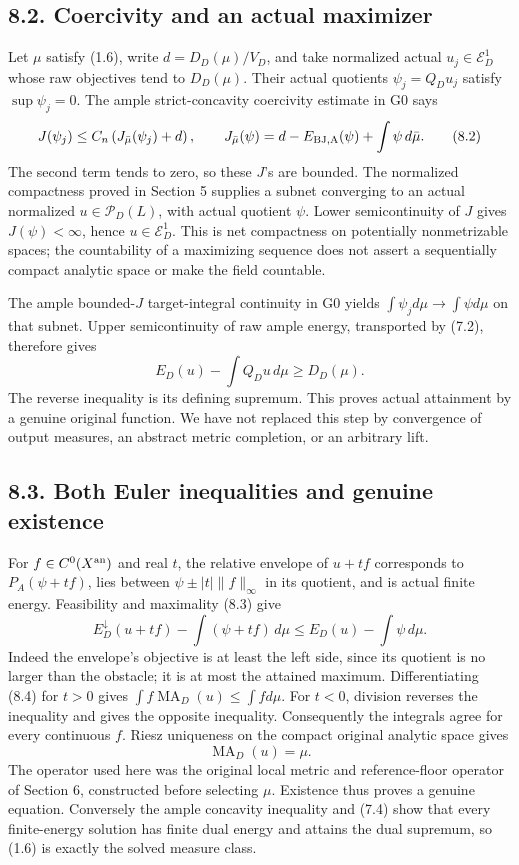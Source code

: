 \documentclass[
  10pt,
]{article}
\begin{document}
\subsection{8.2. Coercivity and an actual
maximizer}\label{coercivity-and-an-actual-maximizer}

Let \(\mu\) satisfy (1.6), write \(d=D_D(\mu)/V_D\), and take normalized
actual \(u_j\in\mathcal E_D^1\) whose raw objectives tend to
\(D_D(\mu)\). Their actual quotients \(\psi_j=Q_Du_j\) satisfy
\(\sup\psi_j=0\). The ample strict-concavity coercivity estimate in G0
says \[J(\psi_j)\leq C_n\left(J_{\bar\mu}(\psi_j)+d\right),\qquad
J_{\bar\mu}(\psi)=d-E_{\rm BJ,A}(\psi)+\int\psi\,d\bar\mu.\tag{8.2}\]
The second term tends to zero, so these \(J\)'s are bounded. The
normalized compactness proved in Section 5 supplies a subnet converging
to an actual normalized \(u\in\mathcal P_D(L)\), with actual quotient
\(\psi\). Lower semicontinuity of \(J\) gives \(J(\psi)<\infty\), hence
\(u\in\mathcal E_D^1\). This is net compactness on potentially
nonmetrizable spaces; the countability of a maximizing sequence does not
assert a sequentially compact analytic space or make the field
countable.

The ample bounded-\(J\) target-integral continuity in G0 yields
\(\int\psi_jd\mu\to\int\psi d\mu\) on that subnet. Upper semicontinuity
of raw ample energy, transported by (7.2), therefore gives
\[E_D(u)-\int Q_Du\,d\mu\geq D_D(\mu).\tag{8.3}\] The reverse inequality
is its defining supremum. This proves actual attainment by a genuine
original function. We have not replaced this step by convergence of
output measures, an abstract metric completion, or an arbitrary lift.

\subsection{8.3. Both Euler inequalities and genuine
existence}\label{both-euler-inequalities-and-genuine-existence}

For \(f\in C^0(X^{\rm an})\) and real \(t\), the relative envelope of
\(u+tf\) corresponds to \(P_A(\psi+tf)\), lies between
\(\psi\pm|t|\|f\|_\infty\) in its quotient, and is actual finite energy.
Feasibility and maximality (8.3) give
\[E_D^{\downarrow}(u+tf)-\int(\psi+tf)\,d\mu
\leq E_D(u)-\int\psi\,d\mu.\tag{8.4}\] Indeed the envelope's objective
is at least the left side, since its quotient is no larger than the
obstacle; it is at most the attained maximum. Differentiating (8.4) for
\(t>0\) gives \(\int f\operatorname{MA}_D(u)\leq\int f d\mu\). For
\(t<0\), division reverses the inequality and gives the opposite
inequality. Consequently the integrals agree for every continuous \(f\).
Riesz uniqueness on the compact original analytic space gives
\[\operatorname{MA}_D(u)=\mu.\tag{8.5}\] The operator used here was the
original local metric and reference-floor operator of Section 6,
constructed before selecting \(\mu\). Existence thus proves a genuine
equation. Conversely the ample concavity inequality and (7.4) show that
every finite-energy solution has finite dual energy and attains the dual
supremum, so (1.6) is exactly the solved measure class.
\end{document}
